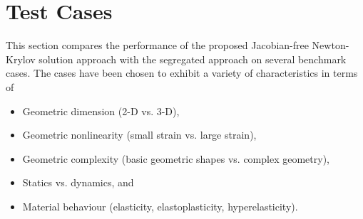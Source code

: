 \documentclass[sn-mathphys,Numbered]{sn-jnl}%
\begin{document}
\section{Test Cases}\label{sec:test_cases}


%	

This section compares the performance of the proposed Jacobian-free Newton-Krylov solution approach with the segregated approach on several benchmark cases.
The cases have been chosen to exhibit a variety of characteristics in terms of
\begin{itemize}
	\item Geometric dimension (2-D vs. 3-D),
	\item Geometric nonlinearity (small strain vs. large strain),
	\item Geometric complexity (basic geometric shapes vs. complex geometry),
	\item Statics vs. dynamics, and
	\item Material behaviour (elasticity, elastoplasticity, hyperelasticity).
\end{itemize}
\end{document}

